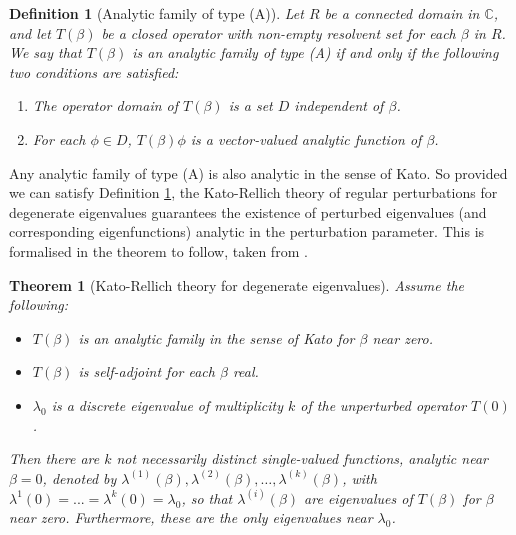 \documentclass[preprint,12pt]{elsarticle}
\newtheorem{theorem}{Theorem}[section]
\newtheorem{definition}{Definition}
\begin{document}
\begin{definition}[Analytic family of type (A)]\label{def_analytic_family_A} Let $R$ be a connected domain in $\mathbb{C}$, and let $T(\beta)$ be a closed operator with non-empty resolvent set for each $\beta$ in $R$. We say that $T(\beta)$ is an analytic family of type (A) if and only if the following two conditions are satisfied:
\begin{enumerate}
    \item[(i)] The operator domain of $T(\beta)$ is a set $D$ independent of $\beta$.
    \item[(ii)] For each $\phi\in D$, $T(\beta)\phi$ is a vector-valued analytic function of $\beta$.
\end{enumerate}
\end{definition}
Any analytic family of type (A) is also analytic in the sense of Kato. \cite[p.16, Vol. 4]{RS} So provided we can satisfy Definition \ref{def_analytic_family_A}, the Kato-Rellich theory of regular perturbations for degenerate eigenvalues guarantees the existence of perturbed eigenvalues (and corresponding eigenfunctions) analytic in the perturbation parameter. This is formalised in the theorem to follow, taken from \cite[Ch. XII.2, Vol. 4]{RS}. 
\begin{theorem}[Kato-Rellich theory for degenerate eigenvalues]\label{Kato_Rellich_degenerate_evalue} Assume the following:
\begin{itemize}
    \item[(i.)] $T(\beta)$ is an analytic family in the sense of Kato for $\beta$ near zero.
    \item[(ii).] $T(\beta)$ is self-adjoint for each $\beta$ real.
    \item[(iii.)] $\lambda_0$ is a discrete eigenvalue of multiplicity $k$ of the unperturbed operator $T(0)$. 
\end{itemize} 
Then there are $k$ not necessarily distinct single-valued functions, analytic near $\beta=0$, denoted by $\lambda^{(1)}(\beta),\lambda^{(2)}(\beta),\ldots,\lambda^{(k)}(\beta)$, with $\lambda^1(0)=...=\lambda^k(0)=\lambda_0$, so that $\lambda^{(i)}(\beta)$ 
are eigenvalues of $T(\beta)$ for $\beta$ near zero. Furthermore, these are the only eigenvalues near $\lambda_0$. 
\end{theorem} 
\end{document}
